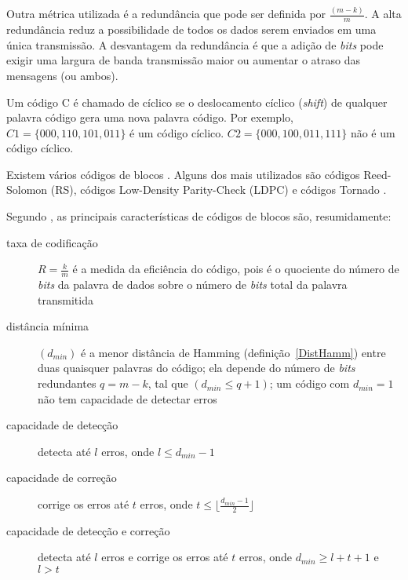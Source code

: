 Outra métrica utilizada é a redundância que pode ser definida por
$\frac{(m - k)}{m}$. A alta redundância reduz a possibilidade de
todos os dados serem enviados em uma única transmissão. A desvantagem
da redundância é que a adição de \emph{bits} pode exigir uma largura
de banda transmissão maior ou aumentar o atraso das mensagens (ou
ambos).


Um código C é chamado de cíclico se o deslocamento cíclico (\emph{shift}) de qualquer palavra código gera uma nova palavra código. Por exemplo, $C1 = \{000, 110, 101, 011\}$ é um código cíclico. $C2 = \{000, 100, 011, 111\}$ não é um código cíclico.

Existem vários códigos de blocos \cite{Byers:1998, Kubiatowicz:2000}. Alguns dos mais utilizados são códigos Reed-Solomon (RS), códigos Low-Density Parity-Check (LDPC) e códigos Tornado \cite{Mitzenmacher:2004, RTAD:2007}.


Segundo \cite{AF:2010}, as principais características de códigos de blocos são, resumidamente:

\begin{description}
   \item [taxa de codificação] $R = \frac{k}{m}$ é a medida da eficiência do código, pois é o quociente do número de \emph{bits} da palavra de dados sobre o número de \emph{bits} total da palavra transmitida
   \item [distância mínima] $(d_{min})$ é a menor distância de Hamming (definição~\ref{DistHamm}) entre duas quaisquer palavras do código; ela depende do número de \emph{bits} redundantes $q = m - k$, tal que  $(d_{min} \leq q + 1)$; um código com $d_{min} = 1$ não tem capacidade de detectar erros
   \item [capacidade de detecção] detecta até $l$ erros, onde $l \leq d_{min} - 1$
   \item [capacidade de correção] corrige os erros até $t$ erros, onde $ t \leq \lfloor \frac{d_{min} - 1}{2} \rfloor$
   \item [capacidade de detecção e correção] detecta até $l$ erros e corrige os erros até $t$ erros, onde $d_{min} \geq l + t + 1$ e $l > t$
\end{description}

